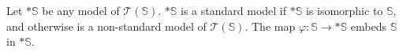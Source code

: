Let $*\mathbb{S}$ be any model of $\mathcal{T}(\mathbb{S})$. $*\mathbb{S}$ is a standard model if $*\mathbb{S}$ is isomorphic to $\mathbb{S}$, and otherwise is a non-standard model of $\mathcal{T}(\mathbb{S})$. The map $\varphi: \mathbb{S} \to *\mathbb{S}$ embeds $\mathbb{S}$ in $*\mathbb{S}$.
